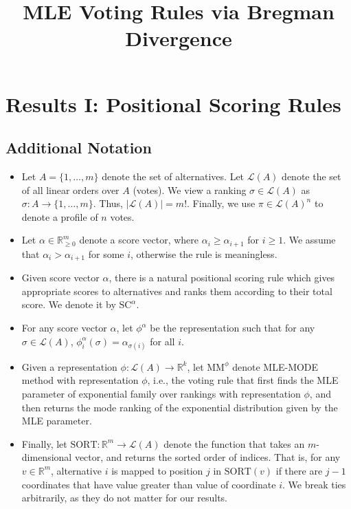 \documentclass[10pt,letterpaper]{article}
\title{MLE Voting Rules via Bregman Divergence}
\newcommand{\calL}{{\mathcal{L}}}
\newcommand{\scr}{{\text{SC}}}
\newcommand{\mm}{\text{MM}}
\newcommand{\rank}{{\calL(A)}}
\newcommand{\uni}{{\rank^n}}
\newcommand{\sca}{{\scr^{\alpha}}}
\newcommand{\sort}{\text{SORT}}
\newcommand{\phia}{\phi^{\alpha}}
\begin{document}
\maketitle


\section{Results I: Positional Scoring Rules}

\subsection{Additional Notation}

\begin{itemize}
\item Let $A=\{1,\ldots,m\}$ denote the set of alternatives. Let $\rank$ denote the set of all linear orders over $A$ (votes). We view a ranking $\sigma \in \rank$ as $\sigma: A \rightarrow \{1,\ldots,m\}$. Thus, $|\rank| = m!$. Finally, we use $\pi \in \uni$ to denote a profile of $n$ votes. 
\item Let $\alpha \in \mathbb{R}_{\ge 0}^m$ denote a score vector, where $\alpha_i \ge \alpha_{i+1}$ for $i \ge 1$. We assume that $\alpha_i > \alpha_{i+1}$ for some $i$, otherwise the rule is meaningless.
\item Given score vector $\alpha$, there is a natural positional scoring rule which gives appropriate scores to alternatives and ranks them according to their total score. We denote it by $\sca$. 
\item For any score vector $\alpha$, let $\phia$ be the representation such that for any $\sigma \in \rank$, $\phia_i(\sigma) = \alpha_{\sigma(i)}$ for all $i$.
\item Given a representation $\phi: \rank \rightarrow \mathbb{R}^k$, let $\mm^{\phi}$ denote MLE-MODE method with representation $\phi$, i.e., the voting rule that first finds the MLE parameter of exponential family over rankings with representation $\phi$, and then returns the mode ranking of the exponential distribution given by the MLE parameter. 
\item Finally, let $\sort : \mathbb{R}^m \rightarrow \rank$ denote the function that takes an $m$-dimensional vector, and returns the sorted order of indices. That is, for any $v \in \mathbb{R}^m$, alternative $i$ is mapped to position $j$ in $\sort(v)$ if there are $j-1$ coordinates that have value greater than value of coordinate $i$. We break ties arbitrarily, as they do not matter for our results. %
\end{itemize}
\end{document}
